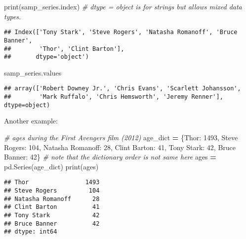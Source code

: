 \documentclass[
]{book}
\newenvironment{Shaded}{\begin{snugshade}}{\end{snugshade}}
\newcommand{\BuiltInTok}[1]{#1}
\newcommand{\CommentTok}[1]{\textcolor[rgb]{0.56,0.35,0.01}{\textit{#1}}}
\newcommand{\DecValTok}[1]{\textcolor[rgb]{0.00,0.00,0.81}{#1}}
\newcommand{\NormalTok}[1]{#1}
\newcommand{\OperatorTok}[1]{\textcolor[rgb]{0.81,0.36,0.00}{\textbf{#1}}}
\newcommand{\StringTok}[1]{\textcolor[rgb]{0.31,0.60,0.02}{#1}}
\begin{document}
\begin{Shaded}
\begin{Highlighting}[]
\BuiltInTok{print}\NormalTok{(samp\_series.index) }\CommentTok{\# dtype = object is for strings but allows mixed data types.}
\end{Highlighting}
\end{Shaded}

\begin{verbatim}
## Index(['Tony Stark', 'Steve Rogers', 'Natasha Romanoff', 'Bruce Banner',
##        'Thor', 'Clint Barton'],
##       dtype='object')
\end{verbatim}

\begin{Shaded}
\begin{Highlighting}[]
\NormalTok{samp\_series.values}
\end{Highlighting}
\end{Shaded}

\begin{verbatim}
## array(['Robert Downey Jr.', 'Chris Evans', 'Scarlett Johansson',
##        'Mark Ruffalo', 'Chris Hemsworth', 'Jeremy Renner'], dtype=object)
\end{verbatim}

Another example:

\begin{Shaded}
\begin{Highlighting}[]
\CommentTok{\# ages during the First Avengers film (2012)}
\NormalTok{age\_dict }\OperatorTok{=}\NormalTok{ \{}\StringTok{\textquotesingle{}Thor\textquotesingle{}}\NormalTok{: }\DecValTok{1493}\NormalTok{,}
\StringTok{\textquotesingle{}Steve Rogers\textquotesingle{}}\NormalTok{: }\DecValTok{104}\NormalTok{,}
\StringTok{\textquotesingle{}Natasha Romanoff\textquotesingle{}}\NormalTok{: }\DecValTok{28}\NormalTok{,}
\StringTok{\textquotesingle{}Clint Barton\textquotesingle{}}\NormalTok{: }\DecValTok{41}\NormalTok{,}
\StringTok{\textquotesingle{}Tony Stark\textquotesingle{}}\NormalTok{: }\DecValTok{42}\NormalTok{,}
\StringTok{\textquotesingle{}Bruce Banner\textquotesingle{}}\NormalTok{: }\DecValTok{42}\NormalTok{\} }\CommentTok{\# note that the dictionary order is not same here}
\NormalTok{ages }\OperatorTok{=}\NormalTok{ pd.Series(age\_dict)}
\BuiltInTok{print}\NormalTok{(ages)}
\end{Highlighting}
\end{Shaded}

\begin{verbatim}
## Thor                1493
## Steve Rogers         104
## Natasha Romanoff      28
## Clint Barton          41
## Tony Stark            42
## Bruce Banner          42
## dtype: int64
\end{verbatim}
\end{document}
